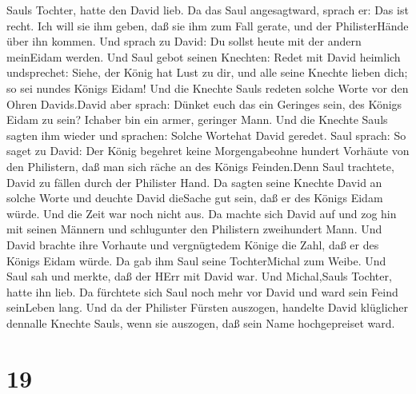 Sauls Tochter, hatte den David lieb. Da das Saul angesagtward, sprach
er: Das ist recht.  Ich will sie ihm geben, daß sie ihm zum
Fall gerate, und der PhilisterHände über ihn kommen. Und sprach zu
David: Du sollst heute mit der andern meinEidam werden. 
Und Saul gebot seinen Knechten: Redet mit David heimlich undsprechet:
Siehe, der König hat Lust zu dir, und alle seine Knechte lieben dich; so
sei nundes Königs Eidam!  Und die Knechte Sauls redeten
solche Worte vor den Ohren Davids.David aber sprach: Dünket euch das ein
Geringes sein, des Königs Eidam zu sein? Ichaber bin ein armer, geringer
Mann.  Und die Knechte Sauls sagten ihm wieder und
sprachen: Solche Wortehat David geredet.  Saul sprach: So
saget zu David: Der König begehret keine Morgengabeohne hundert Vorhäute
von den Philistern, daß man sich räche an des Königs Feinden.Denn Saul
trachtete, David zu fällen durch der Philister Hand.  Da
sagten seine Knechte David an solche Worte und deuchte David dieSache
gut sein, daß er des Königs Eidam würde. Und die Zeit war noch nicht
aus.  Da machte sich David auf und zog hin mit seinen
Männern und schlugunter den Philistern zweihundert Mann. Und David
brachte ihre Vorhaute und vergnügtedem Könige die Zahl, daß er des
Königs Eidam würde. Da gab ihm Saul seine TochterMichal zum Weibe.
 Und Saul sah und merkte, daß der HErr mit David war. Und
Michal,Sauls Tochter, hatte ihn lieb.  Da fürchtete sich
Saul noch mehr vor David und ward sein Feind seinLeben lang.
 Und da der Philister Fürsten auszogen, handelte David
klüglicher dennalle Knechte Sauls, wenn sie auszogen, daß sein Name
hochgepreiset ward.

\hypertarget{section-18}{%
\section{19}\label{section-18}}

